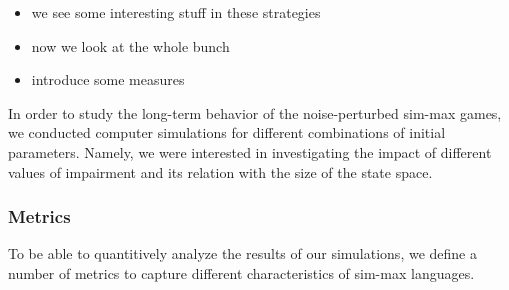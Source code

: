 \begin{itemize}
\item we see some interesting stuff in these strategies
\item now we look at the whole bunch
\item introduce some measures
\end{itemize}




\newpage



In order to study the long-term behavior of the noise-perturbed sim-max games, we conducted computer simulations for different combinations of initial parameters.
Namely, we were interested in investigating the impact of different values of impairment and its relation with the size of the state space.

\subsubsection{Metrics}
\label{sec:metrics}
To be able to quantitively analyze the results of our simulations, we define a number of metrics to capture different characteristics of sim-max languages.

